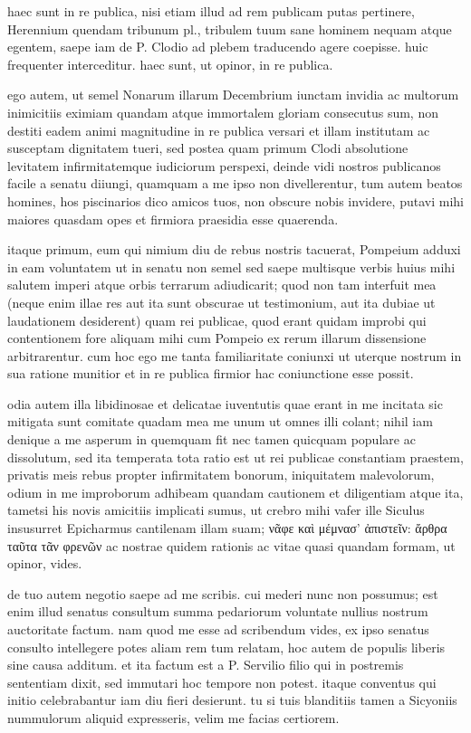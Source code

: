 haec sunt in re publica, nisi etiam illud ad rem publicam putas pertinere, Herennium quendam tribunum pl., tribulem tuum sane hominem nequam atque egentem, saepe iam de P. Clodio ad plebem traducendo agere coepisse. huic frequenter interceditur. haec sunt, ut opinor, in re publica.

 ego autem, ut semel Nonarum illarum Decembrium iunctam invidia ac multorum inimicitiis eximiam quandam atque immortalem gloriam consecutus sum, non destiti eadem animi magnitudine in re publica versari et illam institutam ac susceptam dignitatem tueri, sed postea quam primum Clodi absolutione levitatem infirmitatemque iudiciorum perspexi, deinde vidi nostros publicanos facile a senatu diiungi, quamquam a me ipso non divellerentur, tum autem beatos homines, hos piscinarios dico amicos tuos, non obscure nobis invidere, putavi mihi maiores quasdam opes et firmiora praesidia esse quaerenda.

 itaque primum, eum qui nimium diu de rebus nostris tacuerat, Pompeium adduxi in eam voluntatem ut in senatu non semel sed saepe multisque verbis huius mihi salutem imperi atque orbis terrarum adiudicarit; quod non tam interfuit mea (neque enim illae res aut ita sunt obscurae ut testimonium, aut ita dubiae ut laudationem desiderent) quam rei publicae, quod erant quidam improbi qui contentionem fore aliquam mihi cum Pompeio ex rerum illarum dissensione arbitrarentur. cum hoc ego me tanta familiaritate coniunxi ut uterque nostrum in sua ratione munitior et in re publica firmior hac coniunctione esse possit.

 odia autem illa libidinosae et delicatae iuventutis quae erant in me incitata sic mitigata sunt comitate quadam mea me unum ut omnes illi colant; nihil iam denique a me asperum in quemquam fit nec tamen quicquam populare ac dissolutum, sed ita temperata tota ratio est ut rei publicae constantiam praestem, privatis meis rebus propter infirmitatem bonorum, iniquitatem malevolorum, odium in me improborum adhibeam quandam cautionem et diligentiam atque ita, tametsi his novis amicitiis implicati sumus, ut crebro mihi vafer ille Siculus insusurret Epicharmus cantilenam illam suam; νᾶφε καὶ μέμνασ' ἀπιστεῖν: ἄρθρα ταῦτα τᾶν φρενῶν ac nostrae quidem rationis ac vitae quasi quandam formam, ut opinor, vides.

 de tuo autem negotio saepe ad me scribis. cui mederi nunc non possumus; est enim illud senatus consultum summa pedariorum voluntate nullius nostrum auctoritate factum. nam quod me esse ad scribendum vides, ex ipso senatus consulto intellegere potes aliam rem tum relatam, hoc autem de populis liberis sine causa additum. et ita factum est a P. Servilio filio qui in postremis sententiam dixit, sed immutari hoc tempore non potest. itaque conventus qui initio celebrabantur iam diu fieri desierunt. tu si tuis blanditiis tamen a Sicyoniis nummulorum aliquid expresseris, velim me facias certiorem.

